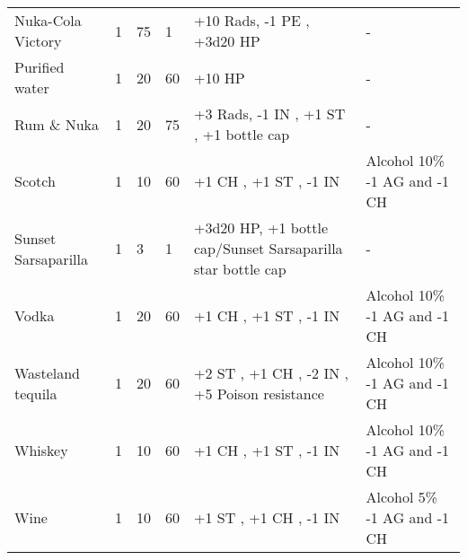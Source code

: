 \begin{longtable}{|p{4cm}|p{1.2cm}|p{1.2cm}|p{1.7cm}|p{3.6cm}|p{3.6cm}|}
Nuka-Cola Victory & 1 & 75 & 1 & +10 Rads, -1 PE , +3d20 HP & - \\
Purified water & 1 & 20 & 60 & +10 HP & - \\
Rum \& Nuka & 1 & 20 & 75 & +3 Rads, -1 IN , +1 ST , +1 bottle cap & - \\
Scotch & 1 & 10 & 60 & +1 CH , +1 ST , -1 IN  & Alcohol 10\% -1 AG and -1 CH \\
Sunset Sarsaparilla & 1 & 3 & 1 & +3d20 HP, +1 bottle cap/Sunset Sarsaparilla star bottle cap & - \\
Vodka & 1 & 20 & 60 & +1 CH , +1 ST , -1 IN  & Alcohol 10\% -1 AG and -1 CH \\
Wasteland tequila & 1 & 20 & 60 & +2 ST , +1 CH , -2 IN , +5 Poison resistance  & Alcohol 10\% -1 AG and -1 CH \\
Whiskey & 1 & 10 & 60 & +1 CH , +1 ST , -1 IN  & Alcohol 10\% -1 AG and -1 CH \\
Wine & 1 & 10 & 60 & +1 ST , +1 CH , -1 IN  & Alcohol 5\% -1 AG and -1 CH \\
\hline
\end{longtable}
